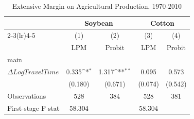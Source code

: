 \begin{table}[htbp]\centering
\def\sym#1{\ifmmode^{#1}\else\(^{#1}\)\fi}
\caption{Extensive Margin on Agricultural Production, 1970-2010}
\begin{tabular}{l*{4}{c}}
\hline\hline
                    &\multicolumn{2}{c}{Soybean}                &\multicolumn{2}{c}{Cotton}                 \\\cmidrule(lr){2-3}\cmidrule(lr){4-5}
                    &\multicolumn{1}{c}{(1)}         &\multicolumn{1}{c}{(2)}         &\multicolumn{1}{c}{(3)}         &\multicolumn{1}{c}{(4)}         \\
                    &         LPM         &      Probit         &         LPM         &      Probit         \\
\hline
main                &                     &                     &                     &                     \\
$\Delta Log Travel Time$&       0.335\sym{*}  &       1.317\sym{**} &       0.095         &       0.573         \\
                    &     (0.180)         &     (0.671)         &     (0.074)         &     (0.542)         \\
\hline
Observations        &         528         &         384         &         528         &         381         \\
First-stage F stat  &      58.304         &                     &      58.304         &                     \\
\hline\hline
\end{tabular}
\end{table}
